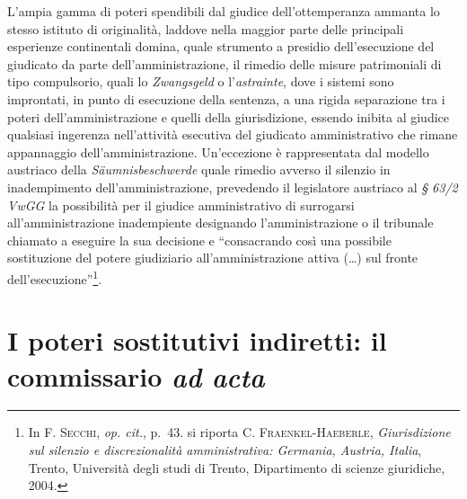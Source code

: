 \documentclass[12pt,it,a4paper,]{report}
\begin{document}
L'ampia gamma di poteri spendibili dal giudice dell'ottemperanza ammanta
lo stesso istituto di originalità, laddove nella maggior parte delle
principali esperienze continentali domina, quale strumento a presidio
dell'esecuzione del giudicato da parte dell'amministrazione, il rimedio
delle misure patrimoniali di tipo compulsorio, quali lo
\emph{Zwangsgeld} o l'\emph{astrainte}, dove i sistemi sono improntati,
in punto di esecuzione della sentenza, a una rigida separazione tra i
poteri dell'amministrazione e quelli della giurisdizione, essendo
inibita al giudice qualsiasi ingerenza nell'attività esecutiva del
giudicato amministrativo che rimane appannaggio dell'amministrazione.
Un'eccezione è rappresentata dal modello austriaco della
\emph{Säumnisbeschwerde} quale rimedio avverso il silenzio in
inadempimento dell'amministrazione, prevedendo il legislatore austriaco
al \emph{§ 63/2 VwGG} la possibilità per il giudice amministrativo di
surrogarsi all'amministrazione inadempiente designando l'amministrazione
o il tribunale chiamato a eseguire la sua decisione e ``consacrando così
una possibile sostituzione del potere giudiziario all'amministrazione
attiva (\ldots) sul fronte dell'esecuzione''\footnote{In
  \textsc{F. Secchi}, \emph{op. cit.}, p.~43. si riporta C.
  \textsc{Fraenkel-Haeberle}, \emph{Giurisdizione sul silenzio e
  discrezionalità amministrativa: Germania, Austria, Italia}, Trento,
  Università degli studi di Trento, Dipartimento di scienze giuridiche,
  2004.}.

\hypertarget{i-poteri-sostitutivi-indiretti-il-commissario-ad-acta}{%
\section{\texorpdfstring{I poteri sostitutivi indiretti: il commissario
\emph{ad
acta}}{I poteri sostitutivi indiretti: il commissario ad acta}}\label{i-poteri-sostitutivi-indiretti-il-commissario-ad-acta}}
\end{document}
